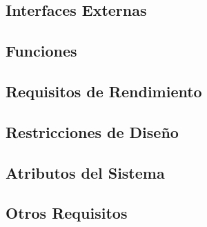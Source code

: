     \subsection{Interfaces Externas}
        
    \subsection{Funciones}
        
    \subsection{Requisitos de Rendimiento}
        
    \subsection{Restricciones de Diseño}
        
    \subsection{Atributos del Sistema}
        
    \subsection{Otros Requisitos}
        